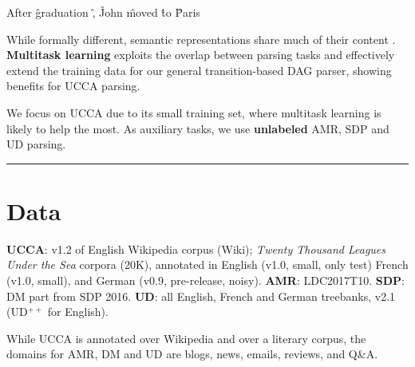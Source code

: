 \documentclass[a0,portrait]{a0poster}
\begin{document}
\begin{multicols}{2}
\begin{minipage}{.55\columnwidth}
\begin{center}
    \vfill
    \begin{dependency}[edge style={-{Latex[length=4mm]}, color=purple},
        text only label, label style={above, color=purple}, font=\small]
    \begin{deptext}[column sep=.8em,ampersand replacement=\^]
    After \^ graduation \^ , \^ John \^ moved \^ to \^ Paris \\
    \end{deptext}
    \end{dependency}
  \end{center}
\end{minipage}

While formally different, semantic representations
share much of their content \cite{abend2017state}.
\textbf{Multitask learning} exploits the overlap between parsing tasks
and effectively extend the training data
for our general transition-based DAG parser,
showing benefits for UCCA parsing.


We focus on UCCA due to its small training set,
where multitask learning is likely to help the most.
As auxiliary tasks, we use \textbf{unlabeled} AMR, SDP and UD parsing.

\hrule

\section*{Data}

\textbf{\color{violet} UCCA}: v1.2 of English Wikipedia corpus (Wiki);
\textit{Twenty Thousand Leagues Under the Sea} corpora (20K),
annotated in English (v1.0, small, only test) French (v1.0, small), and German (v0.9, pre-release, noisy).
\textbf{\color{teal} AMR}: LDC2017T10.
\textbf{\color{blue} SDP}: DM part from SDP 2016.
\textbf{\color{purple} UD}: all English, French and German treebanks, v2.1 (UD$^{++}$ for English).

While UCCA is annotated over Wikipedia and over a literary corpus,
the domains for AMR, DM and UD are blogs, news, emails, reviews, and Q\&A.


\end{multicols}
\end{document}
